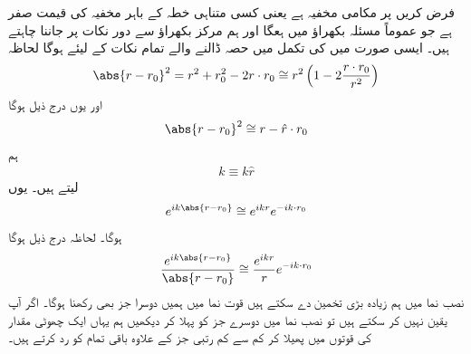 
فرض کریں  پر  مکامی مخفیہ ہے یعنی کسی متناہی خطہ کے باہر مخفیہ کی قیمت صفر ہے جو عموماً مسئلہ بکھراؤ میں ہعگا اور ہم مرکز بکھراؤ سے دور نکات پر  جاننا چاہتے ہیں۔ ایسی صورت میں  کی تکمل میں حصہ ڈالنے والے تمام نکات کے لیئے  ہوگا لحاظہ
\begin{align}
	\abs{r-r_0}^2 = r^2+r_0^2-2r\cdot r_0 \cong r^2\left(1-2\frac{r\cdot r_0}{r^2}\right)
\end{align}
اور یوں درج ذیل ہوگا
\begin{align}
	\abs{r-r_0}^2\cong r-\hat{r}\cdot r_0
\end{align}
ہم 
\begin{align}
	k\equiv k\hat{r}
\end{align}
لیتے ہیں۔ یوں
\begin{align}
	e^{ik\abs{r-r_0}}\cong e^{ikr}e^{-ik\cdot r_0}
\end{align}
ہوگا۔ لحاظہ درج ذیل ہوگا 
\begin{align}
	\frac{e^{ik\abs{r-r_0}}}{\abs{r-r_0}}\cong\frac{e^{ikr}}{r}e^{-ik\cdot r_0}
\end{align}
نصب نما میں ہم زیادہ بڑی تخمین  دے سکتے ہیں قوت نما میں ہمیں دوسرا جز بھی رکھنا ہوگا۔ اگر آپ یقین نہیں کر سکتے ہیں تو نصب نما میں دوسرے جز کو پہلا کر دیکھیں ہم یہاں ایک چھوٹی مقدار  کی قوتوں میں پھیلا کر کم سے کم رتبی جز کے علاوہ باقی تمام کو رد کرتے ہیں۔

